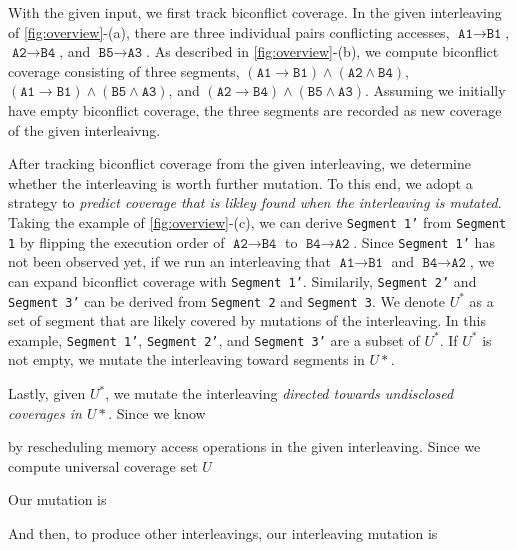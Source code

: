 With the given input, we first track biconflict coverage.  In the
given interleaving of \autoref{fig:overview}-(a), there are three
individual pairs conflicting accesses,
$\texttt{A1} \rightarrow \texttt{B1}$,
$\texttt{A2} \rightarrow \texttt{B4}$, and
$\texttt{B5} \rightarrow \texttt{A3}$.
%
\dr{}
As described in \autoref{fig:overview}-(b), we compute biconflict
coverage consisting of three segments,
$(\texttt{A1} \rightarrow \texttt{B1}) \wedge (\texttt{A2} \wedge
\texttt{B4})$,
$(\texttt{A1} \rightarrow \texttt{B1}) \wedge (\texttt{B5} \wedge
\texttt{A3})$, and
$(\texttt{A2} \rightarrow \texttt{B4}) \wedge (\texttt{B5} \wedge
\texttt{A3})$.
%
Assuming we initially have empty biconflict coverage, the three
segments are recorded as new coverage of the given interleaivng.



After tracking biconflict coverage from the given interleaving, we
determine whether the interleaving is worth further mutation.
%
To this end, we adopt a strategy to \textit{predict coverage that is
  likley found when the interleaving is mutated}.
%
Taking the example of \autoref{fig:overview}-(c), we can derive
\texttt{Segment 1'} from \texttt{Segment 1} by flipping the execution
order of $\texttt{A2} \rightarrow \texttt{B4}$ to
$\texttt{B4} \rightarrow \texttt{A2}$.
%
Since \texttt{Segment 1'} has not been observed yet, if we run an
interleaving that $\texttt{A1} \rightarrow \texttt{B1}$ and
$\texttt{B4} \rightarrow \texttt{A2}$, we can expand biconflict
coverage with \texttt{Segment 1'}.
%
Similarily, \texttt{Segment 2'} and \texttt{Segment 3'} can be derived
from \texttt{Segment 2} and \texttt{Segment 3}.
%
We denote $U^*$ as a set of segment that are likely covered by
mutations of the interleaving. In this example, \texttt{Segment 1'},
\texttt{Segment 2'}, and \texttt{Segment 3'} are a subset of $U^*$.
If $U^*$ is not empty, we mutate the interleaving toward segments in
$U*$.




Lastly, given $U^*$, we mutate the interleaving \textit{directed
  towards undisclosed coverages in $U*$}.
%
Since we know

by rescheduling memory
access operations in the given interleaving.
%
Since we compute  universal coverage set $U$ 

Our mutation is 

%
And then, to produce other interleavings, our interleaving mutation is










